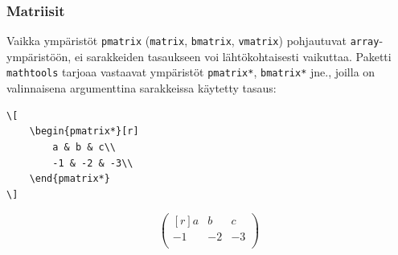 \begin{frame}[fragile]
    
\end{frame}
\begin{frame}[fragile]
    \frametitle{Matriisit}
    Vaikka ympäristöt \verb-pmatrix- (\verb-matrix-, \verb-bmatrix-, \verb-vmatrix-) pohjautuvat \verb-array--ympäristöön, ei sarakkeiden tasaukseen voi lähtökohtaisesti vaikuttaa. \vaihto Paketti \verb-mathtools- tarjoaa vastaavat ympäristöt \verb-pmatrix*-, \verb-bmatrix*- jne., joilla on valinnaisena argumenttina sarakkeissa käytetty tasaus:\vaihto

    \begin{minipage}{4cm}
        \begin{scriptsize}
            \begin{Verbatim}[frame=single]
\[
    \begin{pmatrix*}[r]
        a & b & c\\
        -1 & -2 & -3\\
    \end{pmatrix*}
\]
            \end{Verbatim}
        \end{scriptsize}
    \end{minipage}
    \begin{minipage}{4cm}
        \[
            \begin{pmatrix*}[r]
                a & b & c\\
                -1 & -2 & -3\\
            \end{pmatrix*}
        \]
    \end{minipage}
\end{frame}
